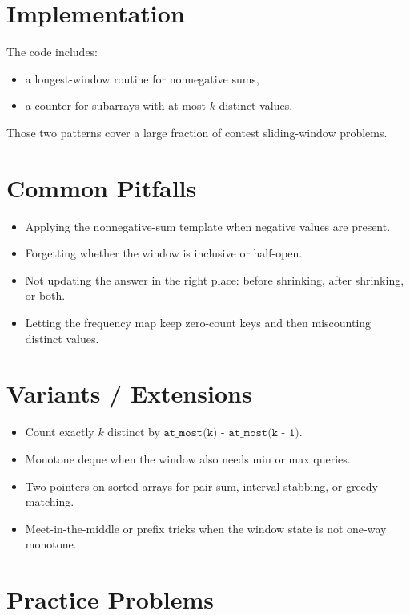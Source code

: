 \section*{Implementation}

The code includes:

\begin{itemize}
  \item a longest-window routine for nonnegative sums,
  \item a counter for subarrays with at most \(k\) distinct values.
\end{itemize}

Those two patterns cover a large fraction of contest sliding-window problems.

\section*{Common Pitfalls}

\begin{itemize}
  \item Applying the nonnegative-sum template when negative values are present.
  \item Forgetting whether the window is inclusive or half-open.
  \item Not updating the answer in the right place: before shrinking, after shrinking, or both.
  \item Letting the frequency map keep zero-count keys and then miscounting distinct values.
\end{itemize}

\section*{Variants / Extensions}

\begin{itemize}
  \item Count exactly \(k\) distinct by \(\texttt{at\_most(k) - at\_most(k - 1)}\).
  \item Monotone deque when the window also needs min or max queries.
  \item Two pointers on sorted arrays for pair sum, interval stabbing, or greedy matching.
  \item Meet-in-the-middle or prefix tricks when the window state is not one-way monotone.
\end{itemize}

\section*{Practice Problems}

